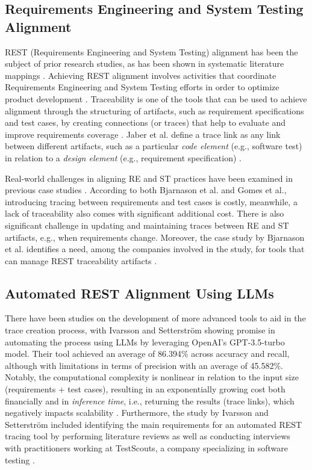 \documentclass[conference]{IEEEtran}
\begin{document}
\subsection{Requirements Engineering and System Testing Alignment}

REST (Requirements Engineering and System Testing) alignment has been the subject of prior research studies, as has been shown in systematic literature mappings \cite{barmi2011Alignment, karhaapa2017What}. Achieving REST alignment involves activities that coordinate Requirements Engineering and System Testing efforts in order to optimize product development \cite{unterkalmsteiner2014Taxonomy}. Traceability is one of the tools that can be used to achieve alignment through the structuring of artifacts, such as requirement specifications and test cases, by creating connections (or traces) that help to evaluate and improve requirements coverage \cite{bjarnason2014Challenges}. Jaber et al. define a trace link as any link between different artifacts, such as a particular \textit{code element} (e.g., software test) in relation to a \textit{design element} (e.g., requirement specification) \cite{jaber2013Effect}. 

Real-world challenges in aligning RE and ST practices have been examined in previous case studies \cite{bjarnason2014Challenges,gomes2017Challenges}. According to both Bjarnason et al. and Gomes et al., introducing tracing between requirements and test cases is costly, meanwhile, a lack of traceability also comes with significant additional cost. There is also significant challenge in updating and maintaining traces between RE and ST artifacts, e.g., when requirements change. Moreover, the case study by Bjarnason et al. identifies a need, among the companies involved in the study, for tools that can manage REST traceability artifacts \cite{bjarnason2014Challenges}.

\subsection{Automated REST Alignment Using LLMs} 

There have been studies on the development of more advanced tools to aid in the trace creation process, with Ivarsson and Setterström showing promise in automating the process using LLMs by leveraging OpenAI’s GPT-3.5-turbo model\cite{ivarsson2023automated}. Their tool achieved an average of 86.394\% across accuracy and recall, although with limitations in terms of precision with an average of 45.582\%. Notably, the computational complexity is nonlinear in relation to the input size (requirements + test cases), resulting in an exponentially growing cost both financially and in \textit{inference time}, i.e., returning the results (trace links), which negatively impacts scalability \cite{ivarsson2023automated}. Furthermore, the study by Ivarsson and Setterström included identifying the main requirements for an automated REST tracing tool by performing literature reviews as well as conducting interviews with practitioners working at TestScouts, a company specializing in software testing \cite{ivarsson2023automated}.
\end{document}
